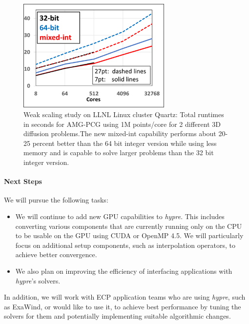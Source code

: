 \begin{figure}
\centering
	\includegraphics[width=3in]{projects/2.3.3-MathLibs/2.3.3.12-SUNDIALS-hypre/hypre-mixed-int.png}
	\caption{\label{fig:mixed-int} Weak scaling study on LLNL Linux cluster Quartz: Total runtimes in seconds for AMG-PCG using 1M points/core for 2 different 3D diffusion problems.The new mixed-int capability performs about 20-25 percent better than the 64 bit integer version while using less memory and is capable to solve larger problems than the 32 bit integer version.}
\end{figure}

\paragraph{Next Steps}

We will pursue the following tasks:

\begin{itemize}
\item We will continue to add new GPU capabilities to {\sl hypre}. This includes converting various components that are currently running only on the CPU to be usable on the GPU using CUDA or OpenMP 4.5. We will particularly focus on additional setup components, such as interpolation operators, to achieve better convergence.
\item We also plan on improving the efficiency of interfacing applications with {\sl hypre}'s solvers.
\end{itemize}
In addition, we will work with ECP application teams who are using {\sl hypre}, such as ExaWind, or would like to use it, to achieve best performance by tuning the solvers for them and potentially implementing suitable algorithmic changes. 


